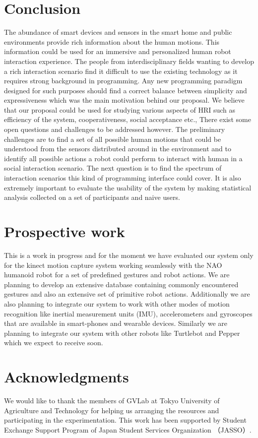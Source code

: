 \documentclass{llncs}
\begin{document}
\section{Conclusion}
The abundance of smart devices and sensors in the smart home and public environments provide rich information about the human motions. This information could be used for an immersive and personalized human robot interaction experience. The people from interdisciplinary fields wanting to develop a rich interaction scenario find it difficult to use the existing technology as it requires strong background in programming. Any new programming paradigm designed for such purposes should find a correct balance between simplicity and expressiveness which was the main motivation behind our proposal. We believe that our proposal could be used for studying various aspects of HRI such as efficiency of the system, cooperativeness, social acceptance etc., There exist some open questions and challenges to be addressed however. The preliminary challenges are to find a set of all possible human motions that could be understood from the sensors distributed around in the environment and to identify all possible actions a robot could perform to interact with human in a social interaction scenario. The next question is to find the spectrum of interaction scenarios this kind of programming interface could cover. It is also extremely important to evaluate the usability of the system by making statistical analysis collected on a set of participants and naive users.
\section{Prospective work}
	This is a work in progress and for the moment we have evaluated our system only for the kinect motion capture system working seamlessly with the NAO humanoid robot for a set of predefined gestures and robot actions. We are planning to develop an extensive database containing commonly encountered gestures and also an extensive set of primitive robot actions. Additionally we are also planning to integrate our system to work with other modes of motion recognition like inertial measurement units (IMU), accelerometers and gyroscopes that are available in smart-phones and wearable devices. Similarly we are planning to integrate our system with other robots like Turtlebot and Pepper which we expect to receive soon.
\section{Acknowledgments}
		We would like to thank the members of GVLab at Tokyo University of Agriculture and Technology for helping us arranging the resources and participating in the experimentation. This work has been supported by Student Exchange Support Program of Japan Student Services Organization （JASSO）.


\end{document}
